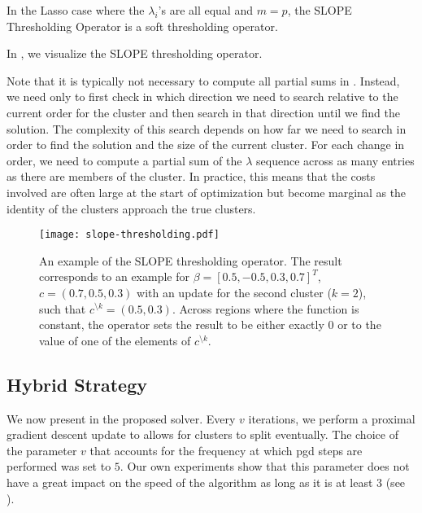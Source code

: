 
\begin{remark}
  In the Lasso case where the $\lambda_i$'s are all equal and $m = p$, the SLOPE Thresholding Operator is a soft thresholding operator.
\end{remark}

In , we visualize the SLOPE thresholding operator.

Note that it is typically not necessary to compute all partial sums in .
Instead, we need only to first check in which direction we need to search relative to the current order for the cluster and then search in that direction until we find the solution.
The complexity of this search depends on how far we need to search in order to find the solution and the size of the current cluster.
For each change in order, we need to compute a partial sum of the \(\lambda\) sequence across as many entries as there are members of the cluster.
In practice, this means that the costs involved are often large at the start of optimization but become marginal as the identity of the clusters approach the true clusters.


\begin{figure*}[htb]
  \centering
  \texttt{[image: slope-thresholding.pdf]}
  \caption{%
  An example of the SLOPE thresholding operator. The result corresponds to an
  example for \(\beta = [0.5, -0.5, 0.3, 0.7]^T\), \(c = (0.7, 0.5, 0.3)\)
  with an update for the second cluster (\(k = 2\)), such that
  \(c^{\setminus k} = (0.5, 0.3)\). Across regions where the function is constant,
      the operator sets the result to be either exactly 0 or to the value of one
      of the elements of \(c^{\setminus k}\).
    }
  \label{fig:slope-thresholding}
\end{figure*}

\subsection{Hybrid Strategy}
\label{sec:hybrid-strategy}

We now present in  the proposed solver.
Every $v$ iterations, we perform a proximal gradient descent update to allows for clusters to split eventually.
The choice of the parameter $v$ that accounts for the frequency at which pgd steps are performed was set to $5$.
Our own experiments show that this parameter does not have a great impact on the speed of the algorithm as long as it is at least $3$ (see ).

